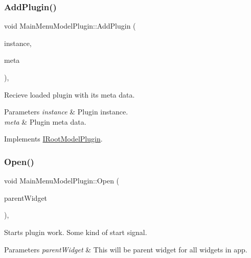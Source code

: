 \subsubsection{\texorpdfstring{Add\+Plugin()}{AddPlugin()}}
{\footnotesize\ttfamily void Main\+Menu\+Model\+Plugin\+::\+Add\+Plugin (\begin{DoxyParamCaption}\item[{Q\+Object $\ast$}]{instance,  }\item[{Q\+Json\+Object $\ast$}]{meta }\end{DoxyParamCaption})\hspace{0.3cm}{\ttfamily [override]}, {\ttfamily [virtual]}}



Recieve loaded plugin with it\textquotesingle{}s meta data. 


\begin{DoxyParams}{Parameters}
{\em instance} & Plugin instance. \\
\hline
{\em meta} & Plugin meta data. \\
\hline
\end{DoxyParams}


Implements \hyperlink{class_i_root_model_plugin_a6c5a6562b3fc16264d36aa6e39b84a7f}{I\+Root\+Model\+Plugin}.

\mbox{\label{class_main_menu_model_plugin_a2eb04afbe1c9a301a7031816f37018ab}} 
\subsubsection{\texorpdfstring{Open()}{Open()}}
{\footnotesize\ttfamily void Main\+Menu\+Model\+Plugin\+::\+Open (\begin{DoxyParamCaption}\item[{Q\+Widget $\ast$}]{parent\+Widget }\end{DoxyParamCaption})\hspace{0.3cm}{\ttfamily [override]}, {\ttfamily [virtual]}}



Starts plugin work. Some kind of \textquotesingle{}start\textquotesingle{} signal. 


\begin{DoxyParams}{Parameters}
{\em parent\+Widget} & This will be parent widget for all widgets in app. \\
\hline
\end{DoxyParams}


